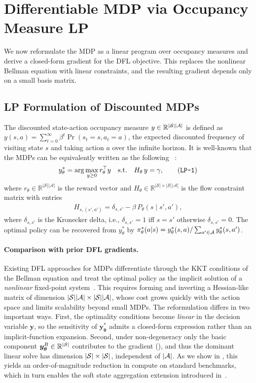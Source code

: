 \section{Differentiable MDP via Occupancy Measure LP}
We now reformulate the MDP as a linear program over occupancy measures and derive a closed-form gradient for the DFL objective. This replaces the nonlinear Bellman equation with linear constraints, and the resulting gradient depends only on a small basis matrix.

\subsection{LP Formulation of Discounted MDPs}
The discounted state-action occupancy measure $y \in \mathbb{R}^{|{\mathcal{S}}||{\mathcal{A}}|}$ is defined as $y(s,a) = \sum_{t=0}^\infty \beta^t \Pr(s_t = s, a_t = a)$, the expected discounted frequency of visiting state $s$ and taking action $a$ over the infinite horizon. It is well-known that the MDPs can be equivalently written as the following \LP~\cite{}:
\begin{align}
    y^*_\theta = \arg\max_{y \geq 0} 
    r_\theta^\top y \quad
    \text{s.t.} \quad
    H_\theta\, y = \gamma, \tag{\texttt{LP-1}}
    \label{eq:lp_primal}
\end{align}
where $r_\theta \in \mathbb{R}^{|\mathcal{S}||\mathcal{A}|}$ is the reward
vector and
$H_\theta \in \mathbb{R}^{|\mathcal{S}| \times |\mathcal{S}||\mathcal{A}|}$
is the flow constraint matrix with entries
\begin{align}
    H_{s,(s',a')} = \delta_{s,s'} - \beta\, P_\theta(s \mid s',a'),
    \label{eq:H_def}
\end{align}
where $\delta_{s,s'}$ is the Kronecker delta, i.e., $\delta_{s,s'} = 1$ iff $s = s'$ otherwise $\delta_{s,s'} = 0$. The optimal policy can be recovered from $y^*_\theta$ by $\pi^*_\theta(a|s) = y^*_\theta(s, a)/\sum_{a' \in {\mathcal{A}}} y^*_\theta(s, a')$.

\paragraph{Comparison with prior DFL gradients.}
Existing DFL approaches for MDPs differentiate through the KKT conditions of the Bellman equation and treat the optimal policy as the implicit solution of a \emph{nonlinear} fixed-point system~\citep{wang2021learning, amos2017optnet}. This requires forming and inverting a Hessian-like matrix of dimension $|{\mathcal{S}}||{\mathcal{A}}| \times |{\mathcal{S}}||{\mathcal{A}}|$, whose cost grows quickly with the action space and limits scalability beyond small MDPs. The \LP reformulation differs in two important ways. First, the optimality conditions become \emph{linear} in the decision variable $\bm{y}$, so the sensitivity of $\bm{y}^*_{\bm{\theta}}$ admits a closed-form expression rather than an implicit-function expansion. Second, under non-degeneracy only the basic component $\bm{y}^B_{\bm{\theta}} \in \mathbb{R}^{|{\mathcal{S}}|}$ contributes to the gradient (), and thus the dominant linear solve has dimension $|{\mathcal{S}}| \times |{\mathcal{S}}|$, independent of $|{\mathcal{A}}|$. As we show in , this yields an order-of-magnitude reduction in compute on standard benchmarks, which in turn enables the soft state aggregation extension introduced in~.
